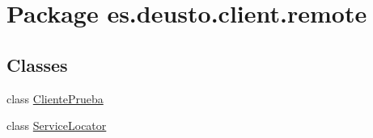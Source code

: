 \hypertarget{namespacees_1_1deusto_1_1client_1_1remote}{}\section{Package es.\+deusto.\+client.\+remote}
\label{namespacees_1_1deusto_1_1client_1_1remote}
\subsection*{Classes}
\begin{DoxyCompactItemize}
\item 
class \mbox{\hyperlink{classes_1_1deusto_1_1client_1_1remote_1_1_cliente_prueba}{Cliente\+Prueba}}
\item 
class \mbox{\hyperlink{classes_1_1deusto_1_1client_1_1remote_1_1_service_locator}{Service\+Locator}}
\end{DoxyCompactItemize}
